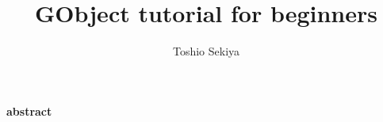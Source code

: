 \documentclass[a4paper]{article}
\title{GObject tutorial for beginners}
\author{Toshio Sekiya}
\date{}
\begin{document}
\maketitle
\begin{center}
\textbf{abstract}
\end{center}

\newpage
\tableofcontents
\newpage
  
  
  
  
  
  
  
  
  
\newpage
\appendix
\end{document}

